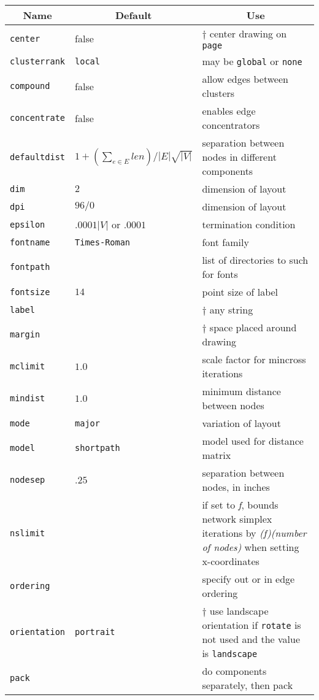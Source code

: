 \begin{table}[htbp]\footnotesize
\centering
\begin{tabular}[t]{|l|l|p{2.5in}|} \hline
\multicolumn{1}{|c|}{Name} & \multicolumn{1}{c|}{Default} & \multicolumn{1}{c|}{Use} \\ \hline
{\tt center} & false & $\dagger$ center drawing on {\tt page} \\ 
{\tt clusterrank} & {\tt local} & may be {\tt global} or {\tt none} \\
{\tt compound} & false & allow edges between clusters \\
{\tt concentrate} & false & enables edge concentrators  \\
{\tt defaultdist} & $1+(\sum_{e \in E} len)/|E|\sqrt{|V|}$  & separation between nodes in different components \\
{\tt dim} & $2$ & dimension of layout  \\
{\tt dpi} & $96/0$ & dimension of layout  \\
{\tt epsilon} & $.0001 |V|$ or $.0001$ & termination condition  \\
{\tt fontname} & {\tt Times-Roman} & font family \\
{\tt fontpath} &  & list of directories to such for fonts \\
{\tt fontsize} & $14$ & point size of label \\
{\tt label} & & $\dagger$ any string \\
{\tt margin} & & $\dagger$ space placed around drawing \\
{\tt mclimit} & $1.0$ & scale factor for mincross iterations \\
{\tt mindist} & $1.0$ & minimum distance between nodes \\
{\tt mode} & {\tt major} & variation of layout \\
{\tt model} & {\tt shortpath} & model used for distance matrix \\
{\tt nodesep} & $.25$ & separation between nodes, in inches \\
{\tt nslimit} & & if set to {\it f}, bounds network simplex iterations by {\it (f)(number of nodes)} when setting x-coordinates \\
{\tt ordering} &  & specify out or in edge ordering \\
{\tt orientation} & {\tt portrait} & $\dagger$ use landscape orientation if {\tt rotate} is not used and the value is {\tt landscape} \\
{\tt pack} &  & do components separately, then pack \\

\end{tabular}
\end{table}
